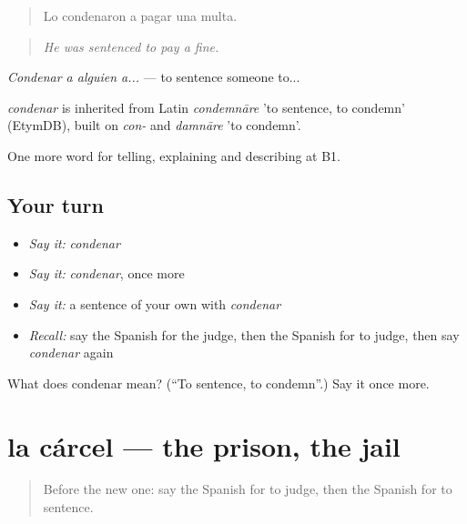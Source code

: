 \begin{quote}
Lo condenaron a pagar una multa.
\end{quote}

\begin{quote}
\emph{He was sentenced to pay a fine.}
\end{quote}

\emph{Condenar a alguien a...} — to sentence someone to...

\begin{cousinweb}
\emph{condenar} is inherited from Latin \emph{condemnāre} 'to sentence, to condemn' (EtymDB), built on \emph{con-} and \emph{damnāre} 'to condemn'.
\end{cousinweb}

\begin{grammarlens}[title={What you've built}]
One more word for telling, explaining and describing at B1.
\end{grammarlens}

\subsection*{Your turn}
\begin{itemize}
\raggedright
  \item \emph{Say it:} \emph{condenar}
  \item \emph{Say it:} \emph{condenar}, once more
  \item \emph{Say it:} a sentence of your own with \emph{condenar}
  \item \emph{Recall:} say the Spanish for the judge, then the Spanish for to judge, then say \emph{condenar} again
\end{itemize}

\begin{tcolorbox}[breakable,colback=teal!4,colframe=teal!35!black,title={Before you move on}]
What does condenar mean? (\textquotedblleft{}To sentence, to condemn\textquotedblright{}.) Say it once more.
\end{tcolorbox}
\section[la cárcel]{la cárcel — the prison, the jail}

\label{lesson:ES-C522-carcel}



\begin{quote}
Before the new one: say the Spanish for to judge, then the Spanish for to sentence.
\end{quote}

